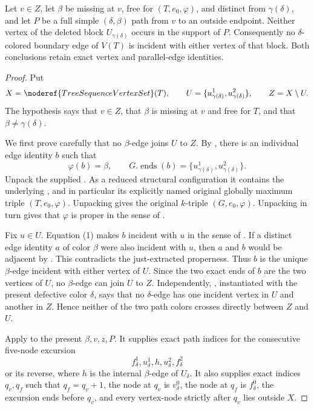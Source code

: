 \begin{helper}
Let $v\in Z$, let $\beta$ be missing at $v$, free for
$(T,e_0,\varphi)$, and distinct from $\gamma(\delta)$, and let $P$ be a
full simple $(\delta,\beta)$ path from $v$ to an outside endpoint.
Neither vertex of the deleted block $U_{\gamma(\delta)}$ occurs in the
support of $P$.
Consequently no $\delta$-colored boundary edge of $V(T)$ is incident
with either vertex of that block.  Both conclusions retain exact vertex
and parallel-edge identities.
\end{helper}
\begin{proof}
Put
\[
 X=\noderef{TreeSequenceVertexSet}(T),\qquad
 U=\{u^1_{\gamma(\delta)},u^2_{\gamma(\delta)}\},\qquad
 Z=X\setminus U.
\]
The hypothesis says that $v\in Z$, that $\beta$ is missing at $v$ and
free for $T$, and that $\beta\ne\gamma(\delta)$.

We first prove carefully that no $\beta$-edge joins $U$ to $Z$.  By
, there is an individual edge
identity $b$ such that
\[
 \varphi(b)=\beta,
 \qquad
 G.\operatorname{ends}(b)
   =\{u^1_{\gamma(\delta)},u^2_{\gamma(\delta)}\}.       \tag{1}
\]
Unpack the supplied .  As a reduced
structural configuration it contains the underlying
, and in particular its explicitly
named original globally maximum triple $(T,e_0,\varphi)$.  Unpacking
 gives the original $k$-triple
$(G,e_0,\varphi)$.  Unpacking  in turn gives that
$\varphi$ is proper in the sense of
.

Fix $u\in U$.  Equation (1) makes $b$ incident with $u$ in the sense of
.  If a distinct edge identity $a$ of color $\beta$
were also incident with $u$, then $a$ and $b$ would be adjacent by
.  This contradicts the just-extracted properness.
Thus $b$ is the unique $\beta$-edge incident with either vertex of $U$.
Since the two exact ends of $b$ are the two vertices of $U$, no
$\beta$-edge can join $U$ to $Z$.  Independently,
, instantiated with the present defective
color $\delta$, says that no $\delta$-edge has one incident vertex in
$U$ and another in $Z$.  Hence neither of the two path colors crosses
directly between $Z$ and $U$.                                      

Apply  to the present
$\beta,v,z,P$.  It supplies exact path indices for the consecutive
five-node excursion
\[
 f^1_\delta,u^1_\delta,h,u^2_\delta,f^2_\delta
\]
or its reverse, where $h$ is the internal $\beta$-edge of $U_\delta$.
It also supplies exact indices $q_v,q_f$ such that $q_f=q_v+1$, the
node at $q_v$ is $v^0_\delta$, the node at $q_f$ is $f^0_\delta$, the
excursion ends before $q_v$, and every vertex-node strictly after $q_v$
lies outside $X$.                                                   


\end{proof}
